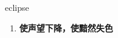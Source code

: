 
\begin{frame}
{\huge eclipse}
\begin{center}
\begin{enumerate}\Large
  \item \textbf{使声望下降，使黯然失色}
\end{enumerate}
\end{center}
\end{frame}
